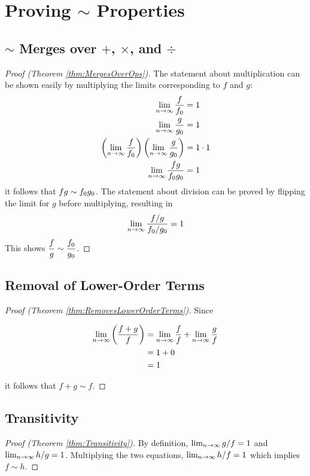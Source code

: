 \appendix
\appendixpage

\section{Proving $\sim$ Properties}

\subsection{$\sim$ Merges over $+$, $\times$, and $\div$}
\label{pf:MergesOverArithmetic}
\begin{proof}[Proof (Theorem \ref{thm:MergesOverOps})]
	The statement about multiplication can be shown easily by multiplying the limits corresponding to $f$ and $g$:
	\begin{align*}
	\lim_{n \to \infty} \frac{f}{f_0} &= 1\\
	\lim_{n \to \infty} \frac{g}{g_0} &= 1\\
	\left( \lim_{n \to \infty} \frac{f}{f_0} \right) \left( \lim_{n \to \infty} \frac{g}{g_0} \right) &= 1 \cdot 1\\
	\lim_{n \to \infty} \frac{fg}{f_0g_0} &= 1
	\end{align*}
	it follows that $fg \sim f_0g_0$. The statement about division can be proved by flipping the limit for $g$ before multiplying, resulting in
	\begin{align*}
	\lim_{n \to \infty} \frac{f / g}{f_0 / g_0} = 1
	\end{align*}
	This shows $\dfrac f g \sim \dfrac {f_0} {g_0}$.
\end{proof}

\subsection{Removal of Lower-Order Terms}
\label{pf:RemovesLowerOrderTerms}

\begin{proof}[Proof (Theorem \ref{thm:RemovesLowerOrderTerms})]
	Since
	
	\begin{align*}
	\lim_{n \to \infty} \left( \frac{f + g}{f} \right) &= \lim_{n \to \infty} \frac{f}{f} + \lim_{n \to \infty} \frac{g}{f}\\
	&= 1 + 0\\
	&= 1
	\end{align*}
	
	it follows that $f + g \sim f$.
\end{proof}

\subsection{Transitivity}
\label{pf:Transitivity}

\begin{proof}[Proof (Theorem \ref{thm:Transitivity})]
By definition, $\lim_{n \to \infty} g / f = 1$ and $\lim_{n \to \infty} h / g = 1$. Multiplying the two equations, $\lim_{n \to \infty} h / f = 1$ which implies $f \sim h$.
\end{proof}